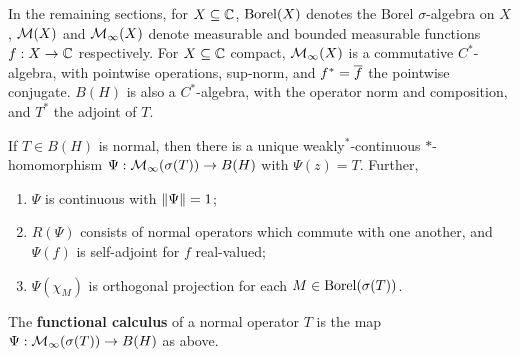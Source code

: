 \documentclass[10pt]{amsart}
\begin{document}
In the remaining sections, for $X \subseteq \mathbb{C}$, $\operatorname{Borel}(X)$ denotes the Borel $\sigma$-algebra on $X$, $\mathcal{M}(X)$ and $\mathcal{M}_\infty(X)$ denote measurable and bounded measurable functions $f : X \to \mathbb{C}$ respectively. For $X \subseteq \mathbb{C}$ compact, $\mathcal{M}_\infty(X)$ is a commutative $C^*$-algebra, with pointwise operations, sup-norm, and $f^* = \overline{f}$ the pointwise conjugate. $B(H)$ is also a $C^*$-algebra, with the operator norm and composition, and $T^*$ the adjoint of $T$.
\begin{proposition}\label{funccalc}
    If $T \in B(H)$ is normal, then there is a unique weakly$^*$-continuous $*$-homomorphism $\Psi : \mathcal{M}_\infty(\sigma(T)) \to B(H)$ with $\Psi(z) = T$. Further, 
    \begin{enumerate}
        \item $\Psi$ is continuous with $\left\| \Psi \right\| = 1$;
        \item $R(\Psi)$ consists of normal operators which commute with one another, and $\Psi(f)$ is self-adjoint for $f$ real-valued;
        \item $\Psi(\chi_M)$ is orthogonal projection for each $M \in \operatorname{Borel}(\sigma(T))$.
    \end{enumerate}
\end{proposition}
\begin{definition}
    The \textbf{functional calculus} of a normal operator $T$ is the map $\Psi : \mathcal{M}_\infty(\sigma(T)) \to B(H)$ as above.
\end{definition}



\end{document}
